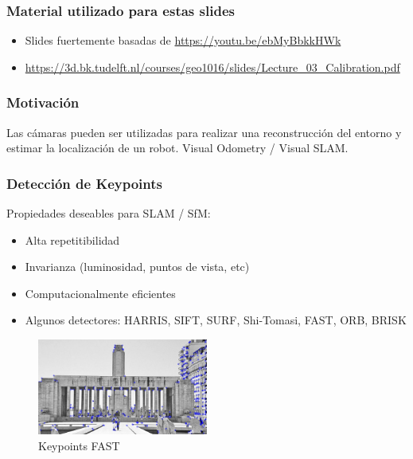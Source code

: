\begin{frame}
    \frametitle{Material utilizado para estas slides}
   
    \footnotesize
    \begin{itemize}
        \item Slides fuertemente basadas de \url{https://youtu.be/ebMyBbkkHWk}
        \item \url{https://3d.bk.tudelft.nl/courses/geo1016/slides/Lecture_03_Calibration.pdf}
    \end{itemize}
    
\end{frame}

\begin{frame}
    \frametitle{Motivación}
    
    Las cámaras pueden ser utilizadas para realizar una reconstrucción del entorno y estimar la localización de un robot. Visual Odometry / Visual SLAM.
    
    
    
\end{frame}


\begin{frame}
	\frametitle{Detección de Keypoints}
	
	
	
	\footnotesize
	Propiedades deseables para SLAM / SfM:
	\begin{itemize}
		\item Alta repetitibilidad
		\item Invarianza (luminosidad, puntos de vista, etc)
		\item Computacionalmente eficientes
		\item Algunos detectores: HARRIS, SIFT, SURF, Shi-Tomasi, FAST, ORB, BRISK
	\end{itemize}

	
	\begin{figure}
		\includegraphics[width=0.5\textwidth]{./images/keypoints_fast}
		\caption{Keypoints FAST}
	\end{figure}

\end{frame}


